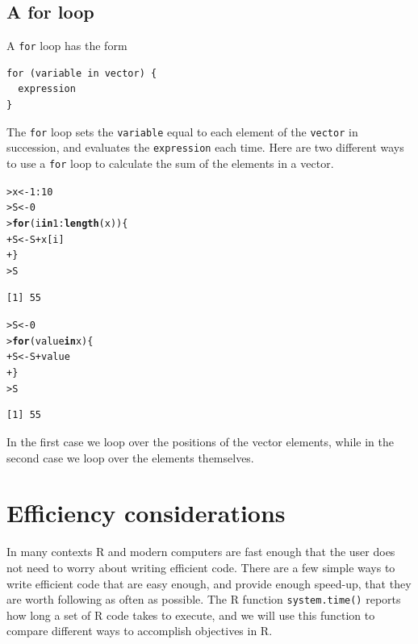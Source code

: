\documentclass[12pt,oneside]{book}\usepackage[]{graphicx}\usepackage[]{color}
\makeatletter
\newcommand{\hlnum}[1]{\textcolor[rgb]{0.686,0.059,0.569}{#1}}%
\newcommand{\hlopt}[1]{\textcolor[rgb]{0,0,0}{#1}}%
\newcommand{\hlstd}[1]{\textcolor[rgb]{0.345,0.345,0.345}{#1}}%
\newcommand{\hlkwa}[1]{\textcolor[rgb]{0.161,0.373,0.58}{\textbf{#1}}}%
\newcommand{\hlkwb}[1]{\textcolor[rgb]{0.69,0.353,0.396}{#1}}%
\newcommand{\hlkwd}[1]{\textcolor[rgb]{0.737,0.353,0.396}{\textbf{#1}}}%
\newenvironment{kframe}{%
 \def\at@end@of@kframe{}%
 \ifinner\ifhmode%
  \def\at@end@of@kframe{\end{minipage}}%
  \begin{minipage}{\columnwidth}%
 \fi\fi%
 \def\FrameCommand##1{\hskip\@totalleftmargin \hskip-\fboxsep
 \colorbox{shadecolor}{##1}\hskip-\fboxsep
     \hskip-\linewidth \hskip-\@totalleftmargin \hskip\columnwidth}%
 \MakeFramed {\advance\hsize-\width
   \@totalleftmargin\z@ \linewidth\hsize
   \@setminipage}}%
 {\par\unskip\endMakeFramed%
 \at@end@of@kframe}
\newenvironment{knitrout}{}{} %
\newcommand{\Rfunc}[1]{\texttt{#1}}
\makeatother
\begin{document}
\subsection{A for loop}
A \verb+for+ loop has the form
\begin{verbatim}
for (variable in vector) {
  expression
}
\end{verbatim}
The \verb+for+ loop sets the \verb+variable+ equal to each element of the \verb+vector+ in succession, and evaluates the \verb+expression+ each time. Here are two different ways to use a \verb+for+ loop to calculate the sum of the elements in a vector.
\begin{knitrout}
\color{fgcolor}\begin{kframe}
\begin{alltt}
\hlstd{> }\hlstd{x} \hlkwb{<-} \hlnum{1}\hlopt{:}\hlnum{10}
\hlstd{> }\hlstd{S} \hlkwb{<-} \hlnum{0}
\hlstd{> }\hlkwa{for} \hlstd{(i} \hlkwa{in} \hlnum{1}\hlopt{:}\hlkwd{length}\hlstd{(x)) \{}
\hlstd{+ }    \hlstd{S} \hlkwb{<-} \hlstd{S} \hlopt{+} \hlstd{x[i]}
\hlstd{+ }\hlstd{\}}
\hlstd{> }\hlstd{S}
\end{alltt}
\begin{verbatim}
[1] 55
\end{verbatim}
\begin{alltt}
\hlstd{> }\hlstd{S} \hlkwb{<-} \hlnum{0}
\hlstd{> }\hlkwa{for} \hlstd{(value} \hlkwa{in} \hlstd{x) \{}
\hlstd{+ }    \hlstd{S} \hlkwb{<-} \hlstd{S} \hlopt{+} \hlstd{value}
\hlstd{+ }\hlstd{\}}
\hlstd{> }\hlstd{S}
\end{alltt}
\begin{verbatim}
[1] 55
\end{verbatim}
\end{kframe}
\end{knitrout}
In the first case we loop over the positions of the vector elements, while in the second case we loop over the elements themselves.
\section{Efficiency considerations}
In many contexts R and modern computers are fast enough that the user does not need to worry about writing efficient code. There are a few simple ways to write efficient code that are easy enough, and provide enough speed-up, that they are worth following as often as possible. The R function \Rfunc{system.time()} reports how long a set of R code takes to execute, and we will use this function to compare different ways to accomplish objectives in R.
\end{document}
